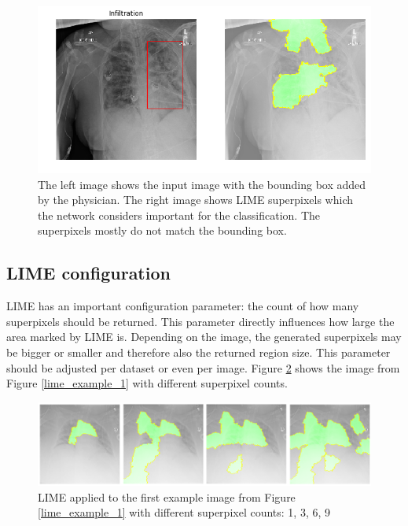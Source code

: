 \begin{figure}[H]
\centering
\includegraphics[width=12cm]{chapters/03_classification/images/lime_8.png}
\caption{The left image shows the input image with the bounding box added by the physician. The right image shows LIME superpixels which the network considers important for the classification. The superpixels mostly do not match the bounding box.}
\label{lime_example_3}
\end{figure}

\subsection{LIME configuration}
LIME has an important configuration parameter: the count of how many superpixels should be returned. This parameter directly influences how large the area marked by LIME is. Depending on the image, the generated superpixels may be bigger or smaller and therefore also the returned region size. This parameter should be adjusted per dataset or even per image. Figure \ref{lime_superpixel_count} shows the image from Figure \ref{lime_example_1} with different superpixel counts.

\begin{figure}[H]
\centering
\includegraphics[width=14cm]{chapters/03_classification/images/lime-superpixel.png}
\caption{LIME applied to the first example image from Figure \ref{lime_example_1} with different superpixel counts: 1, 3, 6, 9}
\label{lime_superpixel_count}
\end{figure}

